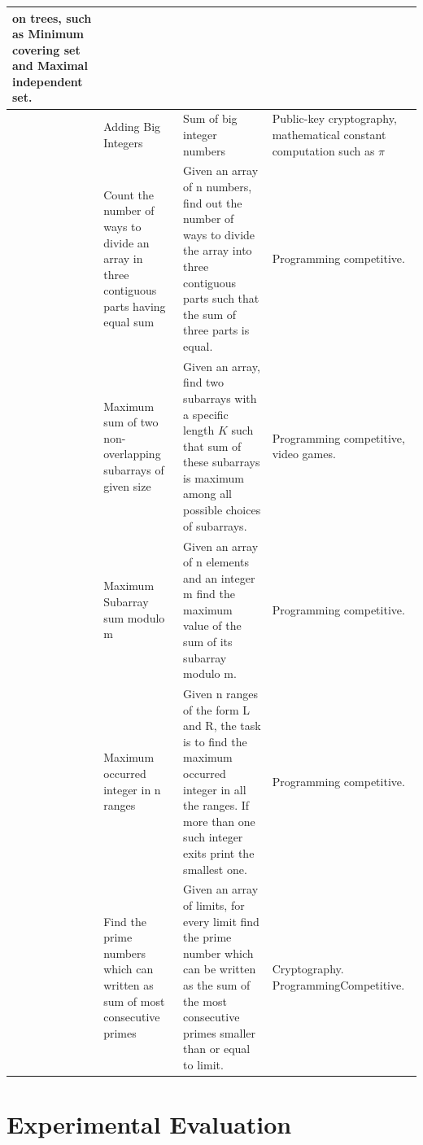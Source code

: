 \documentclass[Ingles]{ic-tese-v1}
\begin{document}
\begin{table}[!t]
\begin{adjustbox}{max width=1.1\textwidth, center}
\begin{tabular}{|>{\centering\arraybackslash}p{0.8cm}|p{5cm}|p{9cm}|p{5cm}|}
			on  trees, such as Minimum   covering   set  and  Maximal
			independent set.\\ \hline
			7   & Adding Big Integers
			&  Sum of big integer numbers
			& Public-key  cryptography,  mathematical  constant computation  such as $\pi$ \\ \hline
			8   & Count the number of ways to divide an array in three contiguous
			parts having equal sum 
			& Given an array of n numbers, find out the number of ways to
			divide the array into three contiguous parts such that the sum
			of three parts is equal.
			& Programming competitive.\\ \hline
			9   & Maximum sum of two non-overlapping subarrays of given size
			& Given an array, find two subarrays with a specific length $K$
			such that sum of these subarrays is maximum among all possible
			choices of subarrays. 
			& Programming competitive, video games.\\ \hline
			10 & Maximum Subarray sum modulo m
			& Given an array of n elements and an integer m 
			find the maximum value of the sum of its subarray modulo m.
			& Programming competitive.\\ \hline
			11 & Maximum occurred integer in n ranges
			& Given n ranges of the form L and R, the task is to find the
			maximum occurred integer in all the ranges. If more than one
			such integer exits print the smallest one.  
			& Programming competitive.\\ \hline
			12 & Find the prime numbers which can written as sum of most
			consecutive primes
			& Given an array of limits, for every limit find the prime number
			which can be written as the sum of the most consecutive primes
			smaller than or equal to limit. 
			& Cryptography. Programming\newline  Competitive.\\
			\hline
		\end{tabular}
	\end{adjustbox}
	\label{tab:benchmark}
\end{table}


\chapter{Experimental Evaluation}
\label{cap:Experiments}
\end{document}
